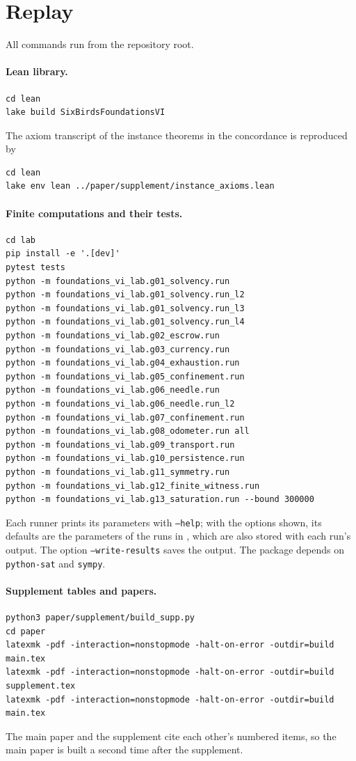\section{Replay}
\label{supp:replay}

All commands run from the repository root.

\paragraph{Lean library.}
\begin{verbatim}
cd lean
lake build SixBirdsFoundationsVI
\end{verbatim}
The axiom transcript of the instance theorems in the concordance is reproduced by
\begin{verbatim}
cd lean
lake env lean ../paper/supplement/instance_axioms.lean
\end{verbatim}

\paragraph{Finite computations and their tests.}
\begin{verbatim}
cd lab
pip install -e '.[dev]'
pytest tests
python -m foundations_vi_lab.g01_solvency.run
python -m foundations_vi_lab.g01_solvency.run_l2
python -m foundations_vi_lab.g01_solvency.run_l3
python -m foundations_vi_lab.g01_solvency.run_l4
python -m foundations_vi_lab.g02_escrow.run
python -m foundations_vi_lab.g03_currency.run
python -m foundations_vi_lab.g04_exhaustion.run
python -m foundations_vi_lab.g05_confinement.run
python -m foundations_vi_lab.g06_needle.run
python -m foundations_vi_lab.g06_needle.run_l2
python -m foundations_vi_lab.g07_confinement.run
python -m foundations_vi_lab.g08_odometer.run all
python -m foundations_vi_lab.g09_transport.run
python -m foundations_vi_lab.g10_persistence.run
python -m foundations_vi_lab.g11_symmetry.run
python -m foundations_vi_lab.g12_finite_witness.run
python -m foundations_vi_lab.g13_saturation.run --bound 300000
\end{verbatim}
Each runner prints its parameters with \texttt{--help}; with the options shown, its defaults are the parameters of the runs
in , which are also stored with each run's output. The option
\texttt{--write-results} saves the output. The package depends on \texttt{python-sat} and
\texttt{sympy}.

\paragraph{Supplement tables and papers.}
\begin{verbatim}
python3 paper/supplement/build_supp.py
cd paper
latexmk -pdf -interaction=nonstopmode -halt-on-error -outdir=build main.tex
latexmk -pdf -interaction=nonstopmode -halt-on-error -outdir=build supplement.tex
latexmk -pdf -interaction=nonstopmode -halt-on-error -outdir=build main.tex
\end{verbatim}
The main paper and the supplement cite each other's numbered items, so the main paper is built a
second time after the supplement.
